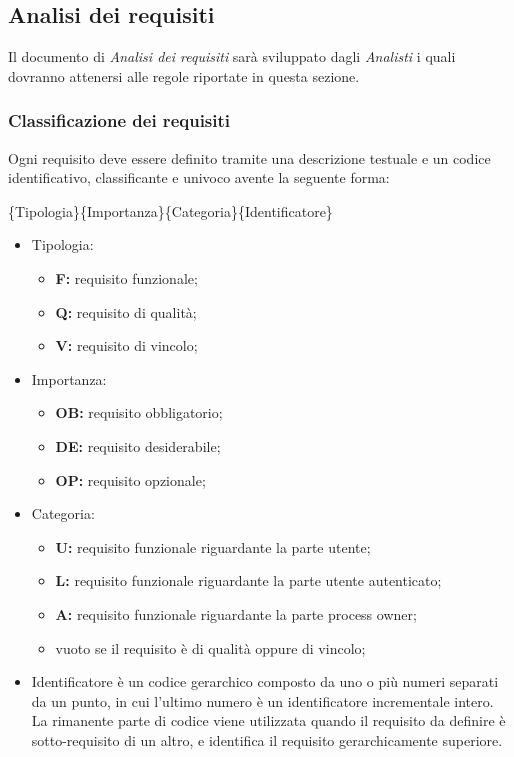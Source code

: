 \subsection{Analisi dei requisiti}
Il documento di \textit{Analisi dei requisiti} sarà sviluppato dagli \textit{Analisti} i quali dovranno attenersi alle regole riportate in questa sezione.

\subsubsection{Classificazione dei requisiti}
Ogni requisito deve essere definito tramite  una descrizione testuale e un codice identificativo, classificante e univoco avente la seguente forma:

\begin{center}\{Tipologia\}\{Importanza\}\{Categoria\}\{Identificatore\}\end{center}


\begin{itemize}

\item Tipologia:
\begin{itemize}
\item \textbf{F:} requisito funzionale;
\item \textbf{Q:} requisito di qualità;
\item \textbf{V:} requisito di vincolo;
\end{itemize}

\item Importanza:
\begin{itemize}
\item \textbf{OB:} requisito obbligatorio;
\item \textbf{DE:} requisito desiderabile;
\item \textbf{OP:} requisito opzionale;
\end{itemize}


\item Categoria:
\begin{itemize}
\item \textbf{U:} requisito funzionale riguardante la parte utente;
\item \textbf{L:} requisito funzionale riguardante la parte utente autenticato;
\item \textbf{A:} requisito funzionale riguardante la parte process owner;
\item vuoto se il requisito è di qualità oppure di vincolo;
\end{itemize}


\item Identificatore è un codice gerarchico composto da uno o più numeri separati da un punto, in cui l'ultimo numero è un identificatore incrementale intero.\\
La rimanente parte di codice viene utilizzata quando il requisito da definire è sotto-requisito di un altro, e identifica il requisito gerarchicamente superiore.

\end{itemize}

